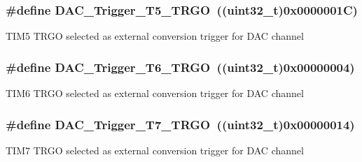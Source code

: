 \subsubsection[{\texorpdfstring{D\+A\+C\+\_\+\+Trigger\+\_\+\+T5\+\_\+\+T\+R\+GO}{DAC_Trigger_T5_TRGO}}]{\setlength{\rightskip}{0pt plus 5cm}\#define D\+A\+C\+\_\+\+Trigger\+\_\+\+T5\+\_\+\+T\+R\+GO~((uint32\+\_\+t)0x0000001\+C)}\hypertarget{group___d_a_c__trigger__selection_ga35352cebfd1ae8a3d63e374a5d86a85d}{}\label{group___d_a_c__trigger__selection_ga35352cebfd1ae8a3d63e374a5d86a85d}
T\+I\+M5 T\+R\+GO selected as external conversion trigger for D\+AC channel 
\subsubsection[{\texorpdfstring{D\+A\+C\+\_\+\+Trigger\+\_\+\+T6\+\_\+\+T\+R\+GO}{DAC_Trigger_T6_TRGO}}]{\setlength{\rightskip}{0pt plus 5cm}\#define D\+A\+C\+\_\+\+Trigger\+\_\+\+T6\+\_\+\+T\+R\+GO~((uint32\+\_\+t)0x00000004)}\hypertarget{group___d_a_c__trigger__selection_ga083307783678a2f1d3066db57dc84cfe}{}\label{group___d_a_c__trigger__selection_ga083307783678a2f1d3066db57dc84cfe}
T\+I\+M6 T\+R\+GO selected as external conversion trigger for D\+AC channel 
\subsubsection[{\texorpdfstring{D\+A\+C\+\_\+\+Trigger\+\_\+\+T7\+\_\+\+T\+R\+GO}{DAC_Trigger_T7_TRGO}}]{\setlength{\rightskip}{0pt plus 5cm}\#define D\+A\+C\+\_\+\+Trigger\+\_\+\+T7\+\_\+\+T\+R\+GO~((uint32\+\_\+t)0x00000014)}\hypertarget{group___d_a_c__trigger__selection_ga9b92d497746be54af46ae4e9c1fc4a6f}{}\label{group___d_a_c__trigger__selection_ga9b92d497746be54af46ae4e9c1fc4a6f}
T\+I\+M7 T\+R\+GO selected as external conversion trigger for D\+AC channel 
